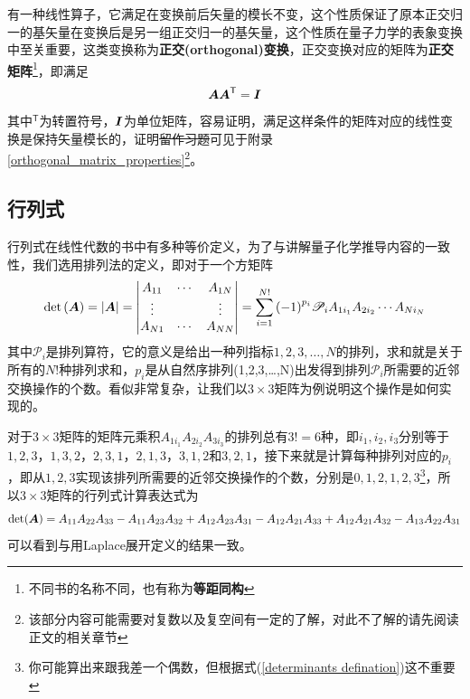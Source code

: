 \documentclass[12pt,a4paper,openany,twoside]{book}
\numberwithin{equation}{section}
\begin{document}
            有一种线性算子，它满足在变换前后矢量的模长不变，这个性质保证了原本正交归一的基矢量在变换后是另一组正交归一的基矢量，这个性质在量子力学的表象变换中至关重要，这类变换称为\textbf{正交(orthogonal)变换}，正交变换对应的矩阵为\textbf{正交矩阵}\footnote{不同书的名称不同，也有称为\textbf{等距同构}}，即满足
            \begin{equation}
              \vb*{A}\vb*{A}^\mathsf{T}=\vb*{I}
            \end{equation}
            其中$^\mathsf{T}$为转置符号，$\vb*{I}$为单位矩阵，容易证明，满足这样条件的矩阵对应的线性变换是保持矢量模长的，证明\sout{留作习题}可见于附录\ref{orthogonal_matrix_properties}\footnote{该部分内容可能需要对复数以及复空间有一定的了解，对此不了解的请先阅读正文的相关章节}。

          \subsection{行列式}
            行列式在线性代数的书中有多种等价定义，为了与讲解量子化学推导内容的一致性，我们选用排列法的定义，即对于一个方矩阵
            \begin{equation}
              \det\qty(\vb*{A})=\abs{\vb*{A}}=\mdet{
                A_{11} & \cdots & A_{1 N} \\
                \vdots & {} & \vdots \\
                A_{N 1} & \cdots & A_{N N}
              }=\sum_{i=1}^{N !}{\qty(-1)^{p_i} \mathscr{P}_i A_{1i_1} A_{2i_2} \cdots A_{N i_N}}
              \label{determinants defination}
            \end{equation}
            其中$\mathscr{P}_i$是排列算符，它的意义是给出一种列指标$1,2,3,\dots,N$的排列，求和就是关于所有的$N!$种排列求和，$p_i$是从自然序排列(1,2,3,\dots,N)出发得到排列$\mathscr{P}_i$所需要的近邻交换操作的个数。看似非常复杂，让我们以$3\times3$矩阵为例说明这个操作是如何实现的。

            对于$3\times3$矩阵的矩阵元乘积$A_{1i_1} A_{2i_2}A_{3i_3}$的排列总有$3!=6$种，即$i_1,i_2,i_3$分别等于$1,2,3$，$1,3,2$，$2,3,1$，$2,1,3$，$3,1,2$和$3,2,1$，接下来就是计算每种排列对应的$p_i$，即从$1,2,3$实现该排列所需要的近邻交换操作的个数，分别是$0,1,2,1,2,3$\footnote{你可能算出来跟我差一个偶数，但根据式(\ref{determinants defination})这不重要}，所以$3\times3$矩阵的行列式计算表达式为
            \begin{equation}
              \det(\vb*{A})=A_{11} A_{22}A_{33}-A_{11} A_{23}A_{32}+A_{12} A_{23}A_{31}-A_{12} A_{21}A_{33}+A_{12} A_{21}A_{32}-A_{13} A_{22}A_{31}
            \end{equation}
            可以看到与用Laplace展开定义的结果一致。
\end{document}
